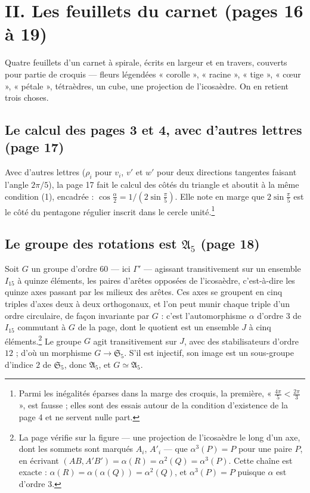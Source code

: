 \documentclass[11pt,a4paper]{article}
\begin{document}
\section*{II. Les feuillets du carnet (pages 16 à 19)}

Quatre feuillets d'un carnet à spirale, écrits en largeur et en travers,
couverts pour partie de croquis --- fleurs légendées « corolle », « racine »,
« tige », « cœur », « pétale », tétraèdres, un cube, une projection de
l'icosaèdre. On en retient trois choses.

\subsection*{Le calcul des pages 3 et 4, avec d'autres lettres (page 17)}

Avec d'autres lettres ($\rho_i$ pour $v_i$, $v'$ et $w'$ pour deux directions
tangentes faisant l'angle $2\pi/5$), la page 17 fait le calcul des côtés du
triangle et aboutit à la même condition (1), encadrée :
$\cos\frac{\alpha}{2} = 1/(2\sin\frac{\pi}{5})$. Elle note en marge que
$2\sin\frac{\pi}{5}$ est le côté du pentagone régulier inscrit dans le cercle
unité.\footnote{Parmi les inégalités éparses dans la marge des croquis, la
première, « $\frac{4\pi}{5} < \frac{2\pi}{3}$ », est fausse ; elles sont des
essais autour de la condition d'existence de la page 4 et ne servent nulle
part.}

\subsection*{Le groupe des rotations est $\mathfrak{A}_5$ (page 18)}

Soit $G$ un groupe d'ordre $60$ --- ici $\Gamma'$ --- agissant
transitivement sur un ensemble $I_{15}$ à quinze éléments, les paires
d'arêtes opposées de l'icosaèdre, c'est-à-dire les quinze axes passant par
les milieux des arêtes. Ces axes se groupent en cinq triples d'axes deux à
deux orthogonaux, et l'on peut munir chaque triple d'un ordre circulaire, de
façon invariante par $G$ : c'est l'automorphisme $\alpha$ d'ordre $3$ de
$I_{15}$ commutant à $G$ de la page, dont le quotient est un ensemble $J$ à
cinq éléments.\footnote{La page vérifie sur la figure --- une projection de
l'icosaèdre le long d'un axe, dont les sommets sont marqués $A_i$, $A'_i$ ---
que $\alpha^{3}(P) = P$ pour une paire $P$, en écrivant
$(AB, A'B') = \alpha(R) = \alpha^{2}(Q) = \alpha^{3}(P)$. Cette chaîne est
exacte : $\alpha(R) = \alpha(\alpha(Q)) = \alpha^{2}(Q)$, et
$\alpha^{3}(P) = P$ puisque $\alpha$ est d'ordre $3$.} Le groupe $G$ agit
transitivement sur $J$, avec des stabilisateurs d'ordre $12$ ; d'où un
morphisme $G \to \mathfrak{S}_5$. S'il est injectif, son image est un
sous-groupe d'indice $2$ de $\mathfrak{S}_5$, donc $\mathfrak{A}_5$, et
$G \simeq \mathfrak{A}_5$.
\end{document}
